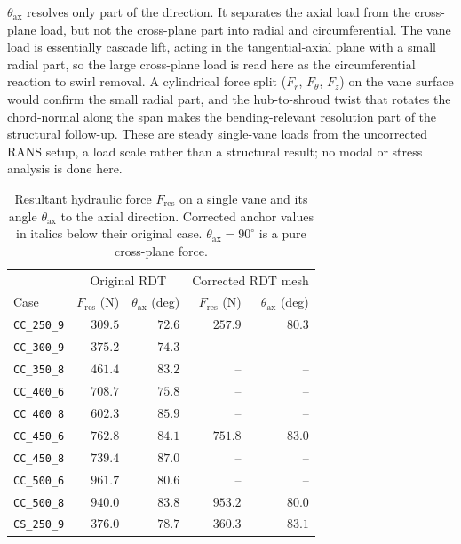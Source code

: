 $\theta_{\mathrm{ax}}$ resolves only part of the direction. It separates the axial load from the cross-plane load, but not the cross-plane part into radial and circumferential. The vane load is essentially cascade lift, acting in the tangential-axial plane with a small radial part, so the large cross-plane load is read here as the circumferential reaction to swirl removal. A cylindrical force split ($F_r$, $F_\theta$, $F_z$) on the vane surface would confirm the small radial part, and the hub-to-shroud twist that rotates the chord-normal along the span makes the bending-relevant resolution part of the structural follow-up. These are steady single-vane loads from the uncorrected RANS setup, a load scale rather than a structural result; no modal or stress analysis is done here.

\begin{table}[H]
\centering
\small
\caption[Single-vane hydraulic force]{Resultant hydraulic force $F_{\mathrm{res}}$ on a single vane and its angle $\theta_{\mathrm{ax}}$ to the axial direction. Corrected anchor values in italics below their original case. $\theta_{\mathrm{ax}} = 90^\circ$ is a pure cross-plane force.}
\label{tab:vane-force}
\begin{tabular}{l rr rr}
\hline
 & \multicolumn{2}{c}{Original RDT} & \multicolumn{2}{c}{Corrected RDT mesh} \\
Case & $F_{\mathrm{res}}$ (N) & $\theta_{\mathrm{ax}}$ (deg) 
     & $F_{\mathrm{res}}$ (N) & $\theta_{\mathrm{ax}}$ (deg) \\ 
\hline
\texttt{CC\_250\_9} & $309.5$  & $72.6$ & $257.9$  & $80.3$ \\
\texttt{CC\_300\_9} & $375.2$  & $74.3$ & --       & --     \\
\texttt{CC\_350\_8} & $461.4$  & $83.2$ & --       & --     \\
\texttt{CC\_400\_6} & $708.7$  & $75.8$ & --       & --     \\
\texttt{CC\_400\_8} & $602.3$  & $85.9$ & --       & --     \\
\texttt{CC\_450\_6} & $762.8$  & $84.1$ & $751.8$  & $83.0$ \\
\texttt{CC\_450\_8} & $739.4$  & $87.0$ & --       & --     \\
\texttt{CC\_500\_6} & $961.7$  & $80.6$ & --       & --     \\
\texttt{CC\_500\_8} & $940.0$  & $83.8$ & $953.2$  & $80.0$ \\
\hline
\texttt{CS\_250\_9} & $376.0$  & $78.7$ & $360.3$  & $83.1$ \\

\end{tabular}
\end{table}
